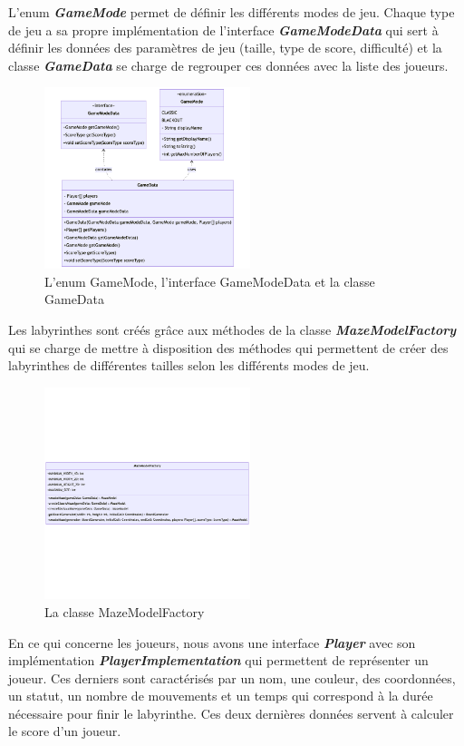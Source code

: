 L'enum \textbf{\textit{GameMode}} permet de définir les différents modes de
jeu. Chaque type de jeu a sa propre implémentation de l'interface
\textbf{\textit{GameModeData}} qui sert à définir les données des paramètres de
jeu (taille, type de score, difficulté) et la classe \textbf{\textit{GameData}}
se charge de regrouper ces données avec la liste des joueurs.

\begin{figure}[H]
    \centering
    \includegraphics[width=6cm]{ressources/Implementation/Labyrinthe/Modele/GameData.png}
    \caption{L'enum GameMode, l'interface GameModeData et la classe GameData}
    \label{fig:GameDataAndElse}
\end{figure}


Les labyrinthes sont créés grâce aux méthodes de la classe
\textbf{\textit{MazeModelFactory}} qui se charge de mettre à disposition des
méthodes qui permettent de créer des labyrinthes de différentes tailles selon
les différents modes de jeu.

\begin{figure}[H]
    \centering
    \includegraphics[width=6cm]{ressources/Implementation/Labyrinthe/Modele/MazeModelFactory.png}
    \caption{La classe MazeModelFactory}
    \label{fig:MazeModelFactory}
\end{figure}

En ce qui concerne les joueurs, nous avons une interface
\textbf{\textit{Player}} avec son implémentation
\textbf{\textit{PlayerImplementation}} qui permettent de représenter un joueur.
Ces derniers sont caractérisés par un nom, une couleur, des coordonnées, un
statut, un nombre de mouvements et un temps qui correspond à la durée nécessaire pour
finir le labyrinthe. Ces deux dernières données servent à calculer le score
d'un joueur.

